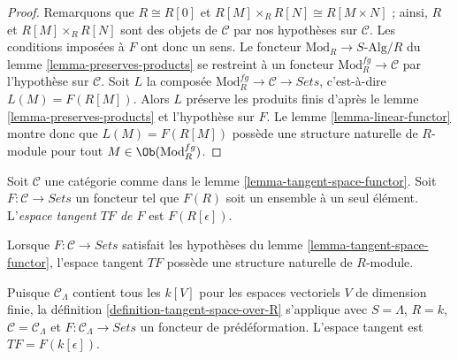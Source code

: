 \begin{proof}
Remarquons que $R \cong R[0]$ et
$R[M] \times_R R[N] \cong R[M \times N]$ ; ainsi, $R$ et
$R[M] \times_R R[N]$ sont des objets de $\mathcal{C}$ par nos hypothèses sur
$\mathcal{C}$. Les conditions imposées à $F$ ont donc un sens. Le foncteur
$\text{Mod}_R \to S\text{-Alg}/R$ du lemme \ref{lemma-preserves-products} se
restreint à un foncteur $\text{Mod}^{fg}_R \to \mathcal{C}$ par l'hypothèse
sur $\mathcal{C}$. Soit $L$ la composée
$\text{Mod}^{fg}_R \to \mathcal{C} \to \textit{Sets}$, c'est-à-dire
$L(M) = F(R[M])$. Alors $L$ préserve les produits finis d'après le lemme
\ref{lemma-preserves-products} et l'hypothèse sur $F$. Le lemme
\ref{lemma-linear-functor} montre donc que $L(M) = F(R[M])$ possède une
structure naturelle de $R$-module pour tout
$M \in \Ob(\text{Mod}^{fg}_R)$.
\end{proof}

\begin{definition}
\label{definition-tangent-space-over-R}
Soit $\mathcal{C}$ une catégorie comme dans le lemme
\ref{lemma-tangent-space-functor}. Soit
$F : \mathcal{C} \to \textit{Sets}$ un foncteur tel que $F(R)$ soit un
ensemble à un seul élément. L'{\it espace tangent $TF$ de $F$} est $F(R[\epsilon])$.
\end{definition}

\noindent
Lorsque $F : \mathcal{C} \to \textit{Sets}$ satisfait les hypothèses du
lemme \ref{lemma-tangent-space-functor}, l'espace tangent $TF$ possède une
structure naturelle de $R$-module.

\begin{example}
\label{example-tangent-space-functor}
Puisque $\mathcal{C}_\Lambda$ contient tous les $k[V]$ pour les espaces
vectoriels $V$ de dimension finie, la définition
\ref{definition-tangent-space-over-R} s'applique avec $S = \Lambda$, $R = k$,
$\mathcal{C} = \mathcal{C}_\Lambda$ et
$F : \mathcal{C}_\Lambda \to \textit{Sets}$ un foncteur de prédéformation.
L'espace tangent est $TF = F(k[\epsilon])$.
\end{example}

